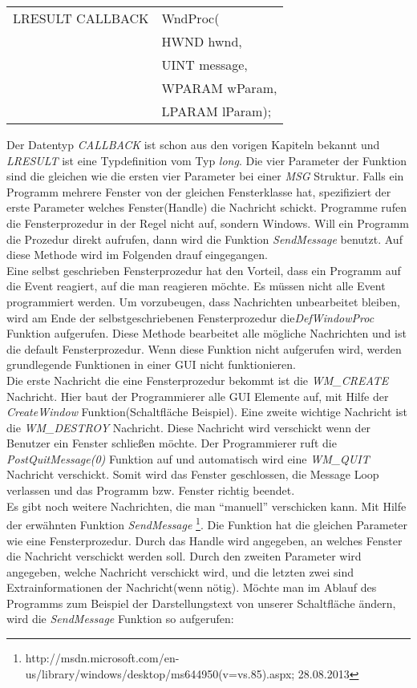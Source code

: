 \begin{tabular}{ll}
LRESULT CALLBACK & WndProc(\\
& HWND hwnd,\\
& UINT message,\\
& WPARAM wParam,\\
& LPARAM lParam);
\end{tabular}

Der Datentyp \textit{CALLBACK} ist schon aus den vorigen Kapiteln bekannt und \textit{LRESULT} ist eine Typdefinition vom Typ \textit{long}. Die vier Parameter der Funktion sind die gleichen wie die ersten vier Parameter bei einer \textit{MSG} Struktur. Falls ein Programm mehrere Fenster von der gleichen Fensterklasse hat, spezifiziert der erste Parameter welches Fenster(Handle) die Nachricht schickt. Programme rufen die Fensterprozedur in der Regel nicht auf, sondern Windows. Will ein Programm die Prozedur direkt aufrufen, dann wird die Funktion \textit{SendMessage} benutzt. Auf diese Methode wird im Folgenden drauf eingegangen.
\\

Eine selbst geschrieben Fensterprozedur hat den Vorteil, dass ein Programm auf die Event reagiert, auf die man reagieren möchte. Es müssen nicht alle Event programmiert werden. Um vorzubeugen, dass Nachrichten unbearbeitet bleiben, wird am Ende der selbstgeschriebenen Fensterprozedur die\textit{DefWindowProc} Funktion aufgerufen. Diese Methode bearbeitet alle mögliche Nachrichten und ist die default Fensterprozedur. Wenn diese Funktion nicht aufgerufen wird, werden grundlegende Funktionen in einer GUI nicht funktionieren.
\\

Die erste Nachricht die eine Fensterprozedur bekommt ist die \textit{WM\_CREATE} Nachricht. Hier baut der Programmierer alle GUI Elemente auf, mit Hilfe der \textit{CreateWindow} Funktion(Schaltfläche Beispiel). Eine zweite wichtige Nachricht ist die \textit{WM\_DESTROY} Nachricht. Diese Nachricht wird verschickt wenn der Benutzer ein Fenster schließen möchte. Der Programmierer ruft die \textit{PostQuitMessage(0)} Funktion auf und automatisch wird eine \textit{WM\_QUIT} Nachricht verschickt. Somit wird das Fenster geschlossen, die Message Loop verlassen und das Programm bzw. Fenster richtig beendet.
\\

Es gibt noch weitere Nachrichten, die man "`manuell"' verschicken kann. Mit Hilfe der erwähnten Funktion \textit{SendMessage} \footnote{http://msdn.microsoft.com/en-us/library/windows/desktop/ms644950(v=vs.85).aspx; 28.08.2013}. Die Funktion hat die gleichen Parameter wie eine Fensterprozedur. Durch das Handle wird angegeben, an welches Fenster die Nachricht verschickt werden soll. Durch den zweiten Parameter wird angegeben, welche Nachricht verschickt wird, und die letzten zwei sind Extrainformationen der Nachricht(wenn nötig). Möchte man im Ablauf des Programms zum Beispiel der Darstellungstext von unserer Schaltfläche ändern, wird die \textit{SendMessage} Funktion so aufgerufen:

